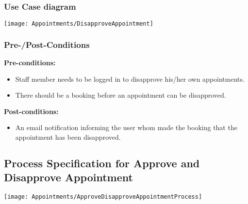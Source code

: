 \subsubsection{Use Case diagram}
\texttt{[image: Appointments/DisapproveAppointment]}

\subsubsection{Pre-/Post-Conditions}\textbf{Pre-conditions:} 
	\begin{itemize}
		\item Staff member needs to be logged in to disapprove his/her own appointments.
		\item There should be a booking before an appointment can be disapproved.
	\end{itemize}
\textbf{ Post-conditions:} 
	\begin{itemize}
		\item An email notification informing the user whom made the booking that the appointment has been disapproved.
	\end{itemize}	

\subsection{Process Specification for Approve and Disapprove Appointment}
	\texttt{[image: Appointments/ApproveDisapproveAppointmentProcess]}	